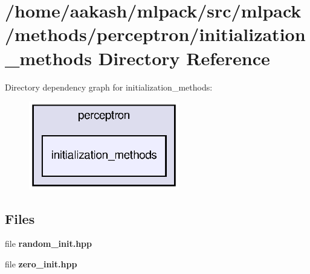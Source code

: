 \section{/home/aakash/mlpack/src/mlpack/methods/perceptron/initialization\+\_\+methods Directory Reference}
\label{dir_99210df2e46ed86bd376cfe0847ba708}
Directory dependency graph for initialization\+\_\+methods\+:
\nopagebreak
\begin{figure}[H]
\begin{center}
\leavevmode
\includegraphics[width=186pt]{dir_99210df2e46ed86bd376cfe0847ba708_dep}
\end{center}
\end{figure}
\subsection*{Files}
\begin{DoxyCompactItemize}
\item 
file \textbf{ random\+\_\+init.\+hpp}
\item 
file \textbf{ zero\+\_\+init.\+hpp}
\end{DoxyCompactItemize}

